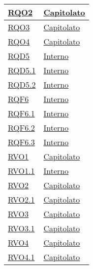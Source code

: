 \begin{longtable}{|>{\centering}m{5cm}|m{5cm}<{\centering}|}
\hyperlink{RQO2}{RQO2} & \hyperlink{Capitolato}{Capitolato}\\ \hline

\hyperlink{RQO3}{RQO3} & \hyperlink{Capitolato}{Capitolato}\\ \hline

\hyperlink{RQO4}{RQO4} & \hyperlink{Capitolato}{Capitolato}\\ \hline

\hyperlink{RQD5}{RQD5} & \hyperlink{Interno}{Interno}\\ \hline

\hyperlink{RQD5.1}{RQD5.1} & \hyperlink{Interno}{Interno}\\ \hline

\hyperlink{RQD5.2}{RQD5.2} & \hyperlink{Interno}{Interno}\\ \hline

\hyperlink{RQF6}{RQF6} & \hyperlink{Interno}{Interno}\\ \hline

\hyperlink{RQF6.1}{RQF6.1} & \hyperlink{Interno}{Interno}\\ \hline

\hyperlink{RQF6.2}{RQF6.2} & \hyperlink{Interno}{Interno}\\ \hline

\hyperlink{RQF6.3}{RQF6.3} & \hyperlink{Interno}{Interno}\\ \hline

\hyperlink{RVO1}{RVO1} & \hyperlink{Capitolato}{Capitolato}\\ \hline

\hyperlink{RVO1.1}{RVO1.1} & \hyperlink{Interno}{Interno}\\ \hline

\hyperlink{RVO2}{RVO2} & \hyperlink{Capitolato}{Capitolato}\\ \hline

\hyperlink{RVO2.1}{RVO2.1} & \hyperlink{Capitolato}{Capitolato}\\ \hline

\hyperlink{RVO3}{RVO3} & \hyperlink{Capitolato}{Capitolato}\\ \hline

\hyperlink{RVO3.1}{RVO3.1} & \hyperlink{Capitolato}{Capitolato}\\ \hline

\hyperlink{RVO4}{RVO4} & \hyperlink{Capitolato}{Capitolato}\\ \hline

\hyperlink{RVO4.1}{RVO4.1} & \hyperlink{Capitolato}{Capitolato}\\ \hline


\end{longtable}
